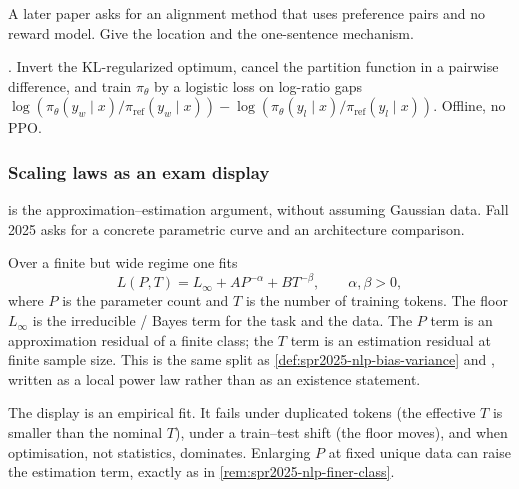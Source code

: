 \begin{exercise}
\label{ex:nlpu-dpo-ptr}
A later paper asks for an alignment method that uses preference pairs and no reward model. Give the location and the one-sentence mechanism.
\end{exercise}

\begin{solution}
. Invert the KL-regularized optimum, cancel the partition function in a pairwise difference, and train $\pi_\theta$ by a logistic loss on log-ratio gaps $\log(\pi_\theta(y_w\mid x)/\pi_{\mathrm{ref}}(y_w\mid x))-\log(\pi_\theta(y_l\mid x)/\pi_{\mathrm{ref}}(y_l\mid x))$. Offline, no PPO.
\end{solution}


\subsubsection{Scaling laws as an exam display}
\label{subsubsec:nlpu-scale}

 is the approximation--estimation argument, without assuming Gaussian data. Fall 2025 asks for a concrete parametric curve and an architecture comparison.

\begin{definition}
\label{def:nlpu-scale}
Over a finite but wide regime one fits
\[
L(P,T)
=
L_\infty
+
A P^{-\alpha}
+
B T^{-\beta},
\qquad
\alpha,\beta>0,
\]
where $P$ is the parameter count and $T$ is the number of training tokens. The floor $L_\infty$ is the irreducible / Bayes term for the task and the data. The $P$ term is an approximation residual of a finite class; the $T$ term is an estimation residual at finite sample size. This is the same split as \cref{def:spr2025-nlp-bias-variance} and , written as a local power law rather than as an existence statement.
\end{definition}

\begin{remark}
\label{rem:nlpu-scale-not-thm}
The display is an empirical fit. It fails under duplicated tokens (the effective $T$ is smaller than the nominal $T$), under a train--test shift (the floor moves), and when optimisation, not statistics, dominates. Enlarging $P$ at fixed unique data can raise the estimation term, exactly as in \cref{rem:spr2025-nlp-finer-class}.
\end{remark}

